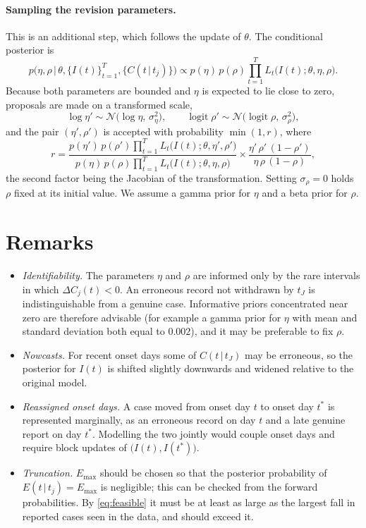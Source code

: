 \documentclass[11pt,a4paper]{article}
\newcommand{\given}{\,|\,}
\newcommand{\Emax}{E_{\max}}
\begin{document}
\paragraph{Sampling the revision parameters.} This is an additional step, which
follows the update of $\theta$. The conditional posterior is
\begin{equation}\label{eq:revision}
p\bigl(\eta,\rho \,\big|\, \theta,\{I(t)\}_{t=1}^{T},\{C(t\given t_j)\}\bigr)
\propto p(\eta)\,p(\rho)\prod_{t=1}^{T}L_t\bigl(I(t);\theta,\eta,\rho\bigr).
\end{equation}
Because both parameters are bounded and $\eta$ is expected to lie close to
zero, proposals are made on a transformed scale,
\begin{equation}
\log\eta' \sim \mathcal{N}\bigl(\log\eta,\,\sigma_\eta^2\bigr),
\qquad
\operatorname{logit}\rho' \sim \mathcal{N}\bigl(\operatorname{logit}\rho,\,\sigma_\rho^2\bigr),
\end{equation}
and the pair $(\eta',\rho')$ is accepted with probability $\min(1,r)$, where
\begin{equation}
r = \frac{p(\eta')\,p(\rho')\prod_{t=1}^{T}L_t\bigl(I(t);\theta,\eta',\rho'\bigr)}
         {p(\eta)\,p(\rho)\prod_{t=1}^{T}L_t\bigl(I(t);\theta,\eta,\rho\bigr)}
    \times\frac{\eta'\,\rho'\,(1-\rho')}{\eta\,\rho\,(1-\rho)} ,
\end{equation}
the second factor being the Jacobian of the transformation. Setting
$\sigma_\rho=0$ holds $\rho$ fixed at its initial value. We assume a gamma prior
for $\eta$ and a beta prior for $\rho$.

\section{Remarks}

\begin{itemize}[itemsep=2pt]
\item \emph{Identifiability.} The parameters $\eta$ and $\rho$ are informed
only by the rare intervals in which $\Delta C_j(t)<0$. An erroneous record not
withdrawn by $t_J$ is indistinguishable from a genuine case. Informative priors
concentrated near zero are therefore advisable (for example a gamma prior for
$\eta$ with mean and standard deviation both equal to $0.002$), and it may be
preferable to fix $\rho$.
\item \emph{Nowcasts.} For recent onset days some of $C(t\given t_J)$ may be
erroneous, so the posterior for $I(t)$ is shifted slightly downwards and
widened relative to the original model.
\item \emph{Reassigned onset days.} A case moved from onset day $t$ to onset
day $t^*$ is represented marginally, as an erroneous record on day $t$ and a
late genuine report on day $t^*$. Modelling the two jointly would couple onset
days and require block updates of $\bigl(I(t),I(t^*)\bigr)$.
\item \emph{Truncation.} $\Emax$ should be chosen so that the posterior
probability of $E(t\given t_j)=\Emax$ is negligible; this can be checked from
the forward probabilities. By \eqref{eq:feasible} it must be at least as large
as the largest fall in reported cases seen in the data, and should exceed it.
\end{itemize}
\end{document}
